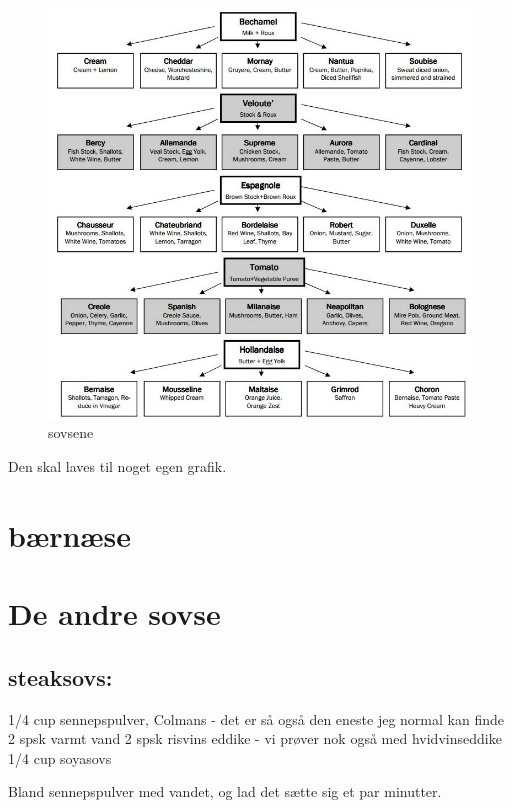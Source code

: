 \documentclass[
]{book}
\begin{document}
\begin{figure}
\centering
\includegraphics{images/saucer.jpg}
\caption{sovsene}
\end{figure}

Den skal laves til noget egen grafik.

\hypertarget{buxe6rnuxe6se}{%
\section{bærnæse}\label{buxe6rnuxe6se}}

\hypertarget{de-andre-sovse}{%
\section{De andre sovse}\label{de-andre-sovse}}

\hypertarget{steaksovs}{%
\subsection{steaksovs:}\label{steaksovs}}

1/4 cup sennepspulver, Colmans - det er så også den eneste jeg normal kan finde
2 spsk varmt vand
2 spsk risvins eddike - vi prøver nok også med hvidvinseddike
1/4 cup soyasovs

Bland sennepspulver med vandet, og lad det sætte sig et par minutter.
\end{document}
